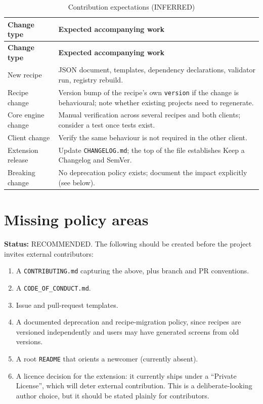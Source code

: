 \begin{longtable}{@{}L{4.2cm}L{10cm}@{}}
\caption{Contribution expectations (INFERRED)}\\
\toprule
\textbf{Change type} & \textbf{Expected accompanying work} \\
\midrule
\endfirsthead
\toprule
\textbf{Change type} & \textbf{Expected accompanying work} \\
\midrule
\endhead
New recipe & JSON document, templates, dependency declarations, validator run,
registry rebuild. \\
Recipe change & Version bump of the recipe's own \texttt{version} if the change is
behavioural; note whether existing projects need to regenerate. \\
Core engine change & Manual verification across several recipes and both clients;
consider a test once tests exist. \\
Client change & Verify the same behaviour is not required in the other client. \\
Extension release & Update \texttt{CHANGELOG.md}; the top of the file establishes
Keep a Changelog and SemVer. \\
Breaking change & No deprecation policy exists; document the impact explicitly
(see below). \\
\bottomrule
\end{longtable}

\section{Missing policy areas}

\textbf{Status:} RECOMMENDED. The following should be created before the project
invites external contributors:

\begin{enumerate}
  \item A \texttt{CONTRIBUTING.md} capturing the above, plus branch and PR
        conventions.
  \item A \texttt{CODE\_OF\_CONDUCT.md}.
  \item Issue and pull-request templates.
  \item A documented deprecation and recipe-migration policy, since recipes are
        versioned independently and users may have generated screens from old
        versions.
  \item A root \texttt{README} that orients a newcomer (currently absent).
  \item A licence decision for the extension: it currently ships under a
        ``Private License'', which will deter external contribution. This is a
        deliberate-looking author choice, but it should be stated plainly for
        contributors.
\end{enumerate}


